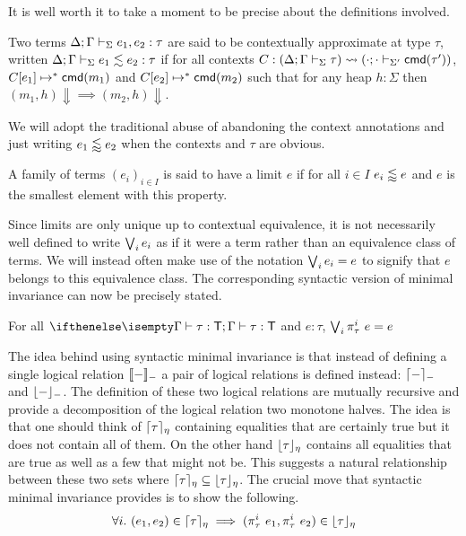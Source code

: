 It is well worth it to take a moment to be precise about the
definitions involved.
\begin{defn}\label{def:smi:contextual-approximation}
  Two terms $\Delta; \Gamma \vdash_{\Sigma} e_1, e_2 \mathrel{:} \tau$ are
  said to be contextually approximate at type $\tau$, written
  $\Delta; \Gamma \vdash_{\Sigma} e_1 \lesssim e_2 \mathrel{:} \tau$ if for all
  contexts
  $C : (\Delta; \Gamma \vdash_{\Sigma} \tau) \rightsquigarrow (\cdot; \cdot \vdash_{\Sigma'} \mathsf{cmd}(\tau'))$,
  $C[e_1] \mapsto^* \mathsf{cmd}(m_1)$ and $C[e_2] \mapsto^* \mathsf{cmd}(m_2)$ such
  that for any heap $h : \Sigma$ then
  $(m_1, h) \Downarrow \implies (m_2, h) \Downarrow$.
\end{defn}
We will adopt the traditional abuse of abandoning the context
annotations and just writing $e_1 \lessapprox e_2$ when the contexts and
$\tau$ are obvious.
\begin{defn}\label{def:smi:contextual-limits}
  A family of terms $(e_i)_{i \in I}$ is said to have a limit $e$ if
  for all $i \in I$ $e_i \lessapprox e$ and $e$ is the smallest element
  with this property.
\end{defn}
Since limits are only unique up to contextual equivalence, it is not
necessarily well defined to write $\bigvee_i e_i$ as if it were a term
rather than an equivalence class of terms. We will instead often make
use of the notation $\bigvee_i e_i = e$ to signify that $e$ belongs to
this equivalence class. The corresponding syntactic version of minimal
invariance can now be precisely stated.
\begin{thm}\label{thm:smi:smi}
  For all $\hasTJ{}{\Gamma}{\tau}{\tp}$ and $e : \tau$,
  $\bigvee_i \pi_\tau^i\ e = e$
\end{thm}
The idea behind using syntactic minimal invariance is that instead of
defining a single logical relation $\llbracket - \rrbracket_{-}$ a pair of logical
relations is defined instead: $\lceil - \rceil_{-}$ and
$\lfloor - \rfloor_{-}$. The definition of these two logical relations are
mutually recursive and provide a decomposition of the logical relation
two monotone halves. The idea is that one should think of
$\lceil \tau \rceil_{\eta}$ containing equalities that are certainly
true but it does not contain all of them. On the other hand
$\lfloor \tau \rfloor_\eta$ contains all equalities that are true as well
as a few that might not be. This suggests a natural relationship
between these two sets where
$\lceil \tau \rceil_\eta \subseteq \lfloor \tau \rfloor_\eta$. The crucial
move that syntactic minimal invariance provides is to show the
following.
\[
  \forall i.\ (e_1, e_2) \in \lceil \tau \rceil_\eta \implies
  (\pi_\tau^i\ e_1, \pi_\tau^i\ e_2) \in \lfloor \tau \rfloor_\eta
\]
